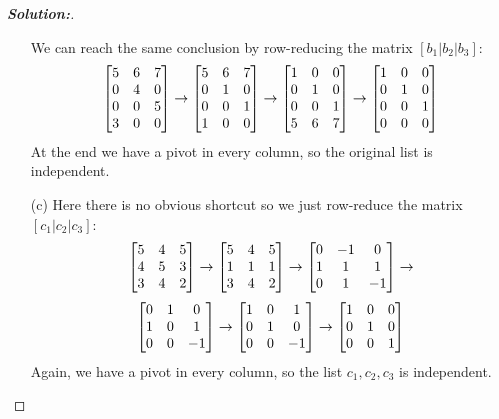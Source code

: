 \documentclass[a4paper]{amsart}
\theoremstyle{definition}
\newenvironment{solution}{\begin{proof}[\textbf{Solution:}] \vphantom{u}}{\end{proof}}
\begin{document}
\begin{solution}
\begin{itemize}
   We can reach the same conclusion by row-reducing the matrix
   $[b_1|b_2|b_3]$: 
   \[ 
     \bbm 5 & 6 & 7 \\
          0 & 4 & 0 \\
          0 & 0 & 5 \\
          3 & 0 & 0
     \ebm 
     \to
     \bbm 5 & 6 & 7 \\
          0 & 1 & 0 \\
          0 & 0 & 1 \\
          1 & 0 & 0
     \ebm 
     \to
     \bbm 1 & 0 & 0 \\
          0 & 1 & 0 \\
          0 & 0 & 1 \\
          5 & 6 & 7
     \ebm 
     \to
     \bbm 1 & 0 & 0 \\
          0 & 1 & 0 \\
          0 & 0 & 1 \\
          0 & 0 & 0
     \ebm 
   \]
   At the end we have a pivot in every column, so the original list is
   independent.
  \item[(c)] Here there is no obvious shortcut so we just row-reduce
   the matrix $[c_1|c_2|c_3]$:
   \[
    \left[\begin{matrix} 5 & 4 & 5 \\ 
         4 & 5 & 3 \\
         3 & 4 & 2 \end{matrix}\right] 
    \to
    \left[\begin{matrix} 5 & 4 & 5 \\ 
         1 & 1 & 1 \\
         3 & 4 & 2 \end{matrix}\right] 
    \to
    \left[\begin{matrix} 0 &-1 & 0 \\ 
         1 & 1 & 1 \\
         0 & 1 &-1 \end{matrix}\right] 
    \to
   \] \[
    \left[\begin{matrix} 0 & 1 & 0 \\ 
         1 & 0 & 1 \\
         0 & 0 &-1 \end{matrix}\right] 
    \to
    \left[\begin{matrix} 1 & 0 & 1 \\
         0 & 1 & 0 \\ 
         0 & 0 &-1 \end{matrix}\right] 
    \to
    \left[\begin{matrix} 1 & 0 & 0 \\
         0 & 1 & 0 \\ 
         0 & 0 & 1 \end{matrix}\right] 
   \]
   Again, we have a pivot in every column, so the list $c_1,c_2,c_3$ is
   independent.
 \end{itemize}
\end{solution}
\end{document}
